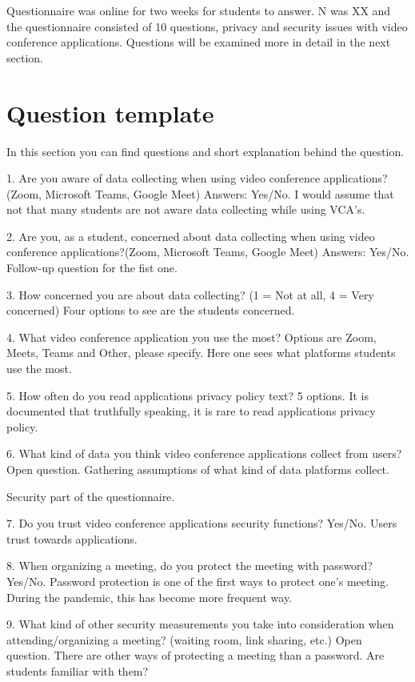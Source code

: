 \documentclass[utf8,english]{gradu3}
\begin{document}
Questionnaire was online for two weeks for students to answer. N was XX and the questionnaire consisted of 10 questions, privacy and security issues with video conference applications. Questions will be examined more in detail in the next section.

\section{Question template}
In this section you can find questions and short explanation behind the question.

1. Are you aware of data collecting when using video conference applications?(Zoom, Microsoft Teams, Google Meet) Answers: Yes/No. I would assume that not that many students are not aware data collecting while using VCA's.

2. Are you, as a student, concerned about data collecting when using video conference applications?(Zoom, Microsoft Teams, Google Meet) Answers: Yes/No. Follow-up question for the fist one. 

3. How concerned you are about data collecting? (1 = Not at all, 4 = Very concerned) Four options to see are the students concerned.

4. What video conference application you use the most? Options are Zoom, Meets, Teams and Other, please specify. Here one sees what platforms students use the most. 

5. How often do you read applications privacy policy text? 5 options. It is documented that truthfully speaking, it is rare to read applications privacy policy.

6. What kind of data you think video conference applications collect from users? Open question. Gathering assumptions of what kind of data platforms collect.

Security part of the questionnaire.

7. Do you trust video conference applications security functions? Yes/No. Users trust towards applications.

8. When organizing a meeting, do you protect the meeting with password? Yes/No. Password protection is one of the first ways to protect one's meeting. During the pandemic, this has become more frequent way.

9. What kind of other security measurements you take into consideration when attending/organizing a meeting? (waiting room, link sharing, etc.) Open question. There are other ways of protecting a meeting than a password. Are students familiar with them?
\end{document}
